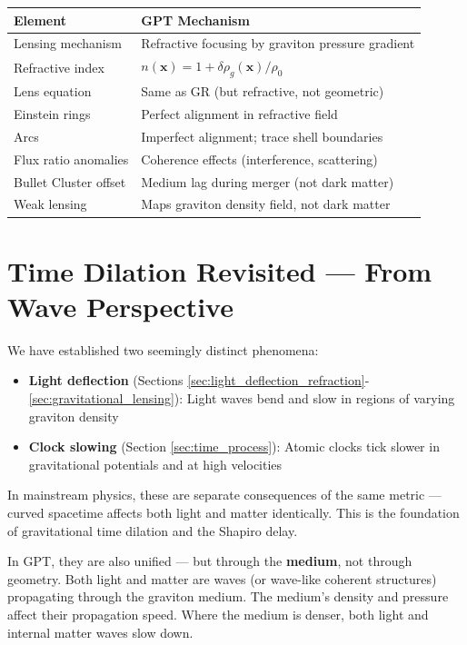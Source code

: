 \documentclass[12pt, a4paper]{article}
\begin{document}
\begin{center}
\begin{tabular}{|p{4cm}|p{10cm}|}
\hline
\textbf{Element} & \textbf{GPT Mechanism} \\
\hline
Lensing mechanism & Refractive focusing by graviton pressure gradient \\
\hline
Refractive index & \( n(\mathbf{x}) = 1 + \delta \rho_g(\mathbf{x})/\rho_0 \) \\
\hline
Lens equation & Same as GR (but refractive, not geometric) \\
\hline
Einstein rings & Perfect alignment in refractive field \\
\hline
Arcs & Imperfect alignment; trace shell boundaries \\
\hline
Flux ratio anomalies & Coherence effects (interference, scattering) \\
\hline
Bullet Cluster offset & Medium lag during merger (not dark matter) \\
\hline
Weak lensing & Maps graviton density field, not dark matter \\
\hline
\end{tabular}
\end{center}

\section{Time Dilation Revisited — From Wave Perspective}
\label{sec:time_dilation_wave}

We have established two seemingly distinct phenomena:
\begin{itemize}
    \item \textbf{Light deflection} (Sections \ref{sec:light_deflection_refraction}-\ref{sec:gravitational_lensing}): Light waves bend and slow in regions of varying graviton density
    \item \textbf{Clock slowing} (Section \ref{sec:time_process}): Atomic clocks tick slower in gravitational potentials and at high velocities
\end{itemize}

In mainstream physics, these are separate consequences of the same metric — curved spacetime affects both light and matter identically. This is the foundation of gravitational time dilation and the Shapiro delay.

In GPT, they are also unified — but through the \textbf{medium}, not through geometry. Both light and matter are waves (or wave-like coherent structures) propagating through the graviton medium. The medium's density and pressure affect their propagation speed. Where the medium is denser, both light and internal matter waves slow down.
\end{document}
